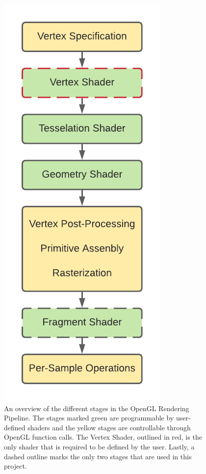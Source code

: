 \begin{figure}[!h]
    \centering
    \includegraphics{img/implementation/RenderingPipeline2.pdf}
    \caption{An overview of the different stages in the OpenGL Rendering Pipeline. The stages marked green are programmable by user-defined shaders and the yellow stages are controllable through OpenGL function calls. The Vertex Shader, outlined in red, is the only shader that is required to be defined by the user. Lastly, a dashed outline marks the only two stages that are used in this project.}
    \label{fig:RenderingPipeline}
\end{figure}


